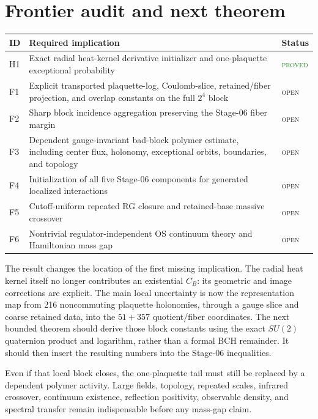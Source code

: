 \documentclass[11pt]{article}
\theoremstyle{definition}
\newcommand{\statusproved}{\textcolor{ForestGreen}{\textsc{proved}}}
\newcommand{\statusopen}{\textcolor{BrickRed}{\textsc{open}}}
\begin{document}
\section{Frontier audit and next theorem}

\begin{longtable}{@{}p{}p{}p{}@{}}
\toprule
ID & Required implication & Status\\
\midrule
\endhead
H1 & Exact radial heat-kernel derivative initializer and one-plaquette exceptional probability & \statusproved\\
F1 & Explicit transported plaquette-log, Coulomb-slice, retained/fiber projection, and overlap constants on the full $2^4$ block & \statusopen\\
F2 & Sharp block incidence aggregation preserving the Stage-06 fiber margin & \statusopen\\
F3 & Dependent gauge-invariant bad-block polymer estimate, including center flux, holonomy, exceptional orbits, boundaries, and topology & \statusopen\\
F4 & Initialization of all five Stage-06 components for generated localized interactions & \statusopen\\
F5 & Cutoff-uniform repeated RG closure and retained-base massive crossover & \statusopen\\
F6 & Nontrivial regulator-independent OS continuum theory and Hamiltonian mass gap & \statusopen\\
\bottomrule
\end{longtable}

The result changes the location of the first missing implication.  The radial
heat kernel itself no longer contributes an existential $C_B$: its geometric
and image corrections are explicit.  The main local uncertainty is now the
representation map from 216 noncommuting plaquette holonomies, through a gauge
slice and coarse retained data, into the $51+357$ quotient/fiber coordinates.
The next bounded theorem should derive those block constants using the exact
$SU(2)$ quaternion product and logarithm, rather than a formal BCH remainder.
It should then insert the resulting numbers into the Stage-06 inequalities.

Even if that local block closes, the one-plaquette tail must still be replaced
by a dependent polymer activity.  Large fields, topology, repeated scales,
infrared crossover, continuum existence, reflection positivity, observable
density, and spectral transfer remain indispensable before any mass-gap claim.
\end{document}
